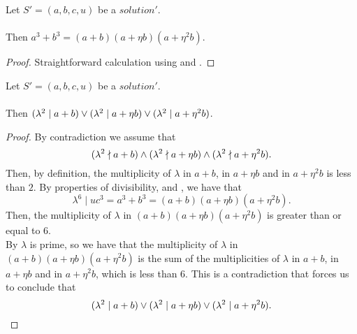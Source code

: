 \begin{lemma}
    \label{lmm:cube_add_cube_eq_mul}
    \leanok
    Let $S'=(a, b, c, u)$ be a $solution'$.\\\\
    Then $a^3 + b^3 = (a + b) (a + \eta b)  (a + \eta^2 b)$.
\end{lemma}
\begin{proof}
    \leanok
    Straightforward calculation using 
    and .
\end{proof}

\begin{lemma}
    \label{lmm:lambda_sq_dvd_or_dvd_or_dvd}
    \leanok
    Let $S'=(a, b, c, u)$ be a $solution'$.\\\\
    Then $(\lambda^2 \mid a + b) \lor (\lambda^2 \mid a +
    \eta b) \lor (\lambda^2 \mid a + \eta^2 b)$.
\end{lemma}
\begin{proof}
    \leanok
    By contradiction we assume that
    $$(\lambda^2 \nmid a + b) \land (\lambda^2 \nmid a +
    \eta b) \land (\lambda^2 \nmid a + \eta^2 b).$$
    Then, by definition, the multiplicity of $\lambda$ in $a + b$, in $a +
    \eta b$ and in $a + \eta^2 b$ is less than $2$.
    By properties of divisibility,  and ,
    we have that
    $$\lambda^6 ∣ u c^3 = a^3 + b^3 = (a + b) (a + \eta b) (a + \eta^2 b).$$
    Then, the multiplicity of $\lambda$ in $(a + b) (a + \eta b) (a + \eta^2 b)$ is greater than
    or equal to $6$. \\
    By  $\lambda$ is prime, so we have that the multiplicity of $\lambda$
    in $(a + b) (a + \eta b) (a + \eta^2 b)$ is the sum of the multiplicities of $\lambda$ in
    $a + b$, in $a + \eta b$ and in $a + \eta^2 b$, which is less than $6$.
    This is a contradiction that forces us to conclude that
    $$(\lambda^2 \mid a + b) \lor (\lambda^2 \mid a +
    \eta b) \lor (\lambda^2 \mid a + \eta^2 b).$$
\end{proof}

